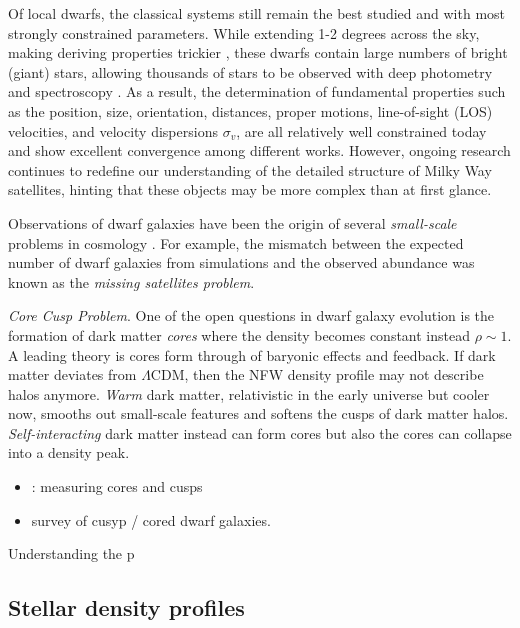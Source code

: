 Of local dwarfs, the classical systems still remain the best studied and
with most strongly constrained parameters. While extending 1-2 degrees
across the sky, making deriving properties trickier
\citep[e.g.,][]{mateo1998}, these dwarfs contain large numbers of bright
(giant) stars, allowing thousands of stars to be observed with deep
photometry and spectroscopy \citep[e.g.,][]{tolstoy+2023, pace+2020}. As
a result, the determination of fundamental properties such as the
position, size, orientation, distances, proper motions, line-of-sight
(LOS) velocities, and velocity dispersions \(\sigma_v\), are all
relatively well constrained today and show excellent convergence among
different works. However, ongoing research continues to redefine our
understanding of the detailed structure of Milky Way satellites, hinting
that these objects may be more complex than at first glance.

Observations of dwarf galaxies have been the origin of several
\emph{small-scale} problems in cosmology
\citep[e.g.,][]{bullock+boylan-kolchin2017}. For example, the mismatch
between the expected number of dwarf galaxies from simulations and the
observed abundance was known as the \emph{missing satellites problem}.

\emph{Core Cusp Problem}. One of the open questions in dwarf galaxy
evolution is the formation of dark matter \emph{cores} where the density
becomes constant instead \(\rho \sim 1\). A leading theory is cores form
through of baryonic effects and feedback. If dark matter deviates from
\(\Lambda\)CDM, then the NFW density profile may not describe halos
anymore. \emph{Warm} dark matter, relativistic in the early universe but
cooler now, smooths out small-scale features and softens the cusps of
dark matter halos. \emph{Self-interacting} dark matter instead can form
cores but also the cores can collapse into a density peak.

\begin{itemize}
\tightlist
\item
  \citet{walker+penarrubia2011}: measuring cores and cusps
\item
  \citet{oh+2011} survey of cusyp / cored dwarf galaxies.
\end{itemize}

Understanding the p

\subsection{Stellar density profiles}\label{stellar-density-profiles}

